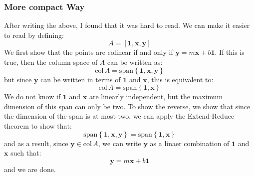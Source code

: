 \documentclass{article}
\newcommand{\spann}[1]{\mathrm{span}\left\{#1\right\}}
\newcommand{\col}[1]{\mathrm{col\,} #1}
\begin{document}
\subsubsection*{More compact Way}
After writing the above, I found that it was hard to read. We can make it easier to read by defining:
\begin{equation}
    A = [\bm{1}, \bm{x}, \bm{y}]
\end{equation}
We first show that the points are colinear if and only if $\bm{y}=m\bm{x}+b\bm{1}$. If this is true, then the column space of $A$ can be written as:
\begin{equation}
    \col A = \spann{\bm{1},\bm{x},\bm{y}}
\end{equation}
but since $\bm{y}$ can be written in terms of $\bm{1}$ and $\bm{x}$, this is equivalent to:
\begin{equation}
    \col A = \spann{\bm{1}, \bm{x}}
\end{equation}
We do not know if $\bm{1}$ and $\bm{x}$ are linearly independent, but the maximum dimension of this span can only be two. To show the reverse, we show that since the dimension of the span is at most two, we can apply the Extend-Reduce theorem to show that:
\begin{equation}
    \spann{\bm{1},\bm{x},\bm{y}} = \spann{\bm{1},\bm{x}}
\end{equation}
and as a result, since $\bm{y} \in \col A$, we can write $\bm{y}$ as a linaer combination of $\bm{1}$ and $\bm{x}$ such that:
\begin{equation}
    \bm{y} = m\bm{x}+b\bm{1}
\end{equation}
and we are done.
\end{document}
